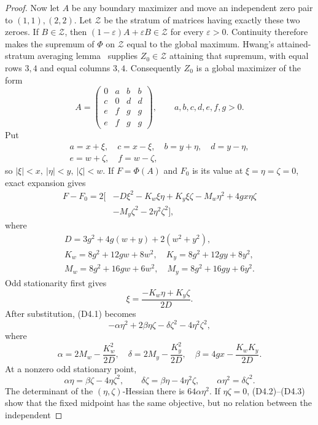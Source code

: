 \documentclass[11pt]{amsart}
\theoremstyle{definition}
\theoremstyle{remark}
\begin{document}
\begin{proof}
Now let \(A\) be any boundary maximizer and move an independent zero pair
to \((1,1),(2,2)\).  Let \(\mathcal Z\) be the stratum of matrices having
exactly these two zeroes.  If \(B\in\mathcal Z\), then
\((1-\varepsilon)A+\varepsilon B\in\mathcal Z\) for every
\(\varepsilon>0\).  Continuity therefore makes the supremum of \(\Phi\) on
\(\mathcal Z\) equal to the global maximum.  Hwang's attained-stratum
averaging lemma~\cite[Lemma 3.4]{CW} supplies \(Z_0\in\mathcal Z\) attaining
that supremum, with equal rows \(3,4\) and equal columns \(3,4\).
Consequently \(Z_0\) is a global maximizer of the form
\[
 A=\begin{pmatrix}
 0&a&b&b\\ c&0&d&d\\ e&f&g&g\\ e&f&g&g
 \end{pmatrix},\qquad a,b,c,d,e,f,g>0.
\]
Put
\[
\begin{gathered}
a=x+\xi,\quad c=x-\xi,\quad b=y+\eta,\quad d=y-\eta,\\
e=w+\zeta,\quad f=w-\zeta,
\end{gathered}
\]
so \(|\xi|<x,\ |\eta|<y,\ |\zeta|<w\).  If \(F=\Phi(A)\) and \(F_0\)
is its value at \(\xi=\eta=\zeta=0\), exact expansion gives
\[
\begin{split}
F-F_0=2[&-D\xi^2-K_w\xi\eta+K_y\xi\zeta-M_w\eta^2
 +4gx\eta\zeta\\
&-M_y\zeta^2-2\eta^2\zeta^2],
\end{split}                                                    \tag{D4.1}
\]
where
\[
\begin{gathered}
D=3g^2+4g(w+y)+2(w^2+y^2),\\
K_w=8g^2+12gw+8w^2,\quad K_y=8g^2+12gy+8y^2,\\
M_w=8g^2+16gw+6w^2,\quad M_y=8g^2+16gy+6y^2.
\end{gathered}
\]
Odd stationarity first gives
\[
\xi=\frac{-K_w\eta+K_y\zeta}{2D}.
\]
After substitution, (D4.1) becomes
\[
-\alpha\eta^2+2\beta\eta\zeta-\delta\zeta^2
-4\eta^2\zeta^2,                                  \tag{D4.2}
\]
where
\[
\alpha=2M_w-\frac{K_w^2}{2D},\quad
\delta=2M_y-\frac{K_y^2}{2D},\quad
\beta=4gx-\frac{K_wK_y}{2D}.
\]
At a nonzero odd stationary point,
\[
\alpha\eta=\beta\zeta-4\eta\zeta^2,\qquad
\delta\zeta=\beta\eta-4\eta^2\zeta,\qquad
\alpha\eta^2=\delta\zeta^2.                       \tag{D4.3}
\]
The determinant of the \((\eta,\zeta)\)-Hessian there is
\(64\alpha\eta^2\).  If \(\eta\zeta=0\), (D4.2)--(D4.3) show that the fixed
midpoint has the same objective, but no relation between the independent

\end{proof}
\end{document}
